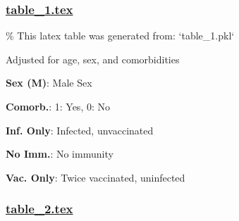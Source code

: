 \documentclass[11pt]{article}
\begin{document}
\subsubsection*{\hyperlink{code-LaTeX Table Design-table-1-tex}{table\_1.tex}}

\begin{codeoutput}
\% This latex table was generated from: `table\_1.pkl`
\begin{table}[h]
\caption{Association between symptom numbers and immunity group}
\label{table:symp\_grp}
\begin{threeparttable}
\renewcommand{\TPTminimum}{\linewidth}
\begin{tablenotes}
\footnotesize
\item Adjusted for age, sex, and comorbidities
\item \textbf{Sex (M)}: Male Sex
\item \textbf{Comorb.}: 1: Yes, 0: No
\item \textbf{Inf. Only}: Infected, unvaccinated
\item \textbf{No Imm.}: No immunity
\item \textbf{Vac. Only}: Twice vaccinated, uninfected
\end{tablenotes}
\end{threeparttable}
\end{table}
\end{codeoutput}

\subsubsection*{\hyperlink{code-LaTeX Table Design-table-2-tex}{table\_2.tex}}
\end{document}
